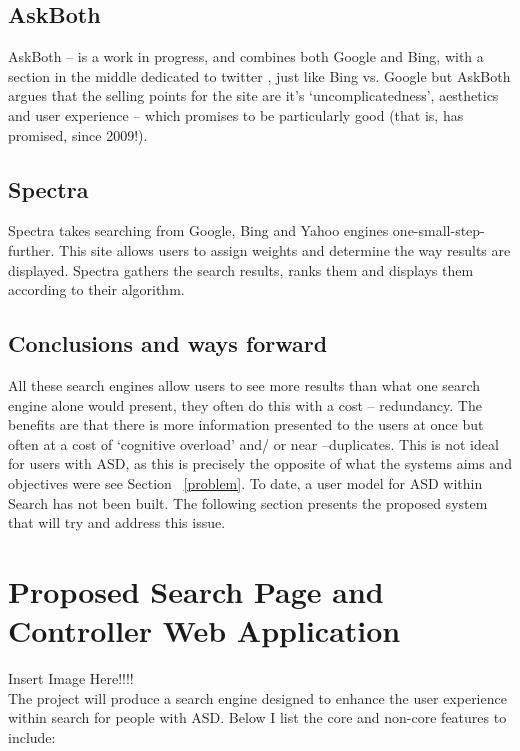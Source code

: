 \documentclass[11pt]{article}
\begin{document}
\subsection{AskBoth}
AskBoth – is a work in progress, and combines both Google and Bing, with a section in the middle dedicated to twitter , just like Bing vs. Google but AskBoth argues that the selling points for the site are it’s ‘uncomplicatedness’, aesthetics and user experience – which promises to be particularly good (that is, has promised, since 2009!).

\subsection{Spectra}
Spectra takes searching from Google, Bing and Yahoo engines one-small-step-further. This site allows users to assign weights and determine the way results are displayed. Spectra gathers the search results, ranks them and displays them according to their algorithm. 

\subsection{Conclusions and ways forward}
All these search engines allow users to see more results than what one search engine alone would present, they often do this with a cost -- redundancy. The benefits are that there is more information presented to the users at once but often at a cost of ‘cognitive overload’ and/ or near –duplicates. This is not ideal for users with ASD, as this is precisely the opposite of what the systems aims and objectives were see Section ~\ref{problem}.
To date, a user model for ASD within Search has not been built. The following section presents the proposed system that will try and address this issue.


\section{Proposed Search Page and Controller Web Application}

Insert Image Here!!!!\\The project will produce a search engine designed to enhance the user experience within search for people with ASD. Below I list the core and non-core features to include:
\end{document}
